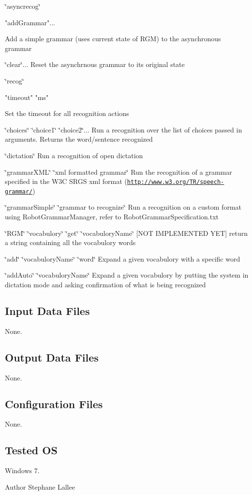 \char`\"{}asyncrecog\char`\"{} \begin{DoxyVerb}"addGrammar"...
\end{DoxyVerb}
 Add a simple grammar (uses current state of R\+G\+M) to the asynchronous grammar

\char`\"{}clear\char`\"{}... Reset the asynchrnous grammar to its original state

\char`\"{}recog\char`\"{} \begin{DoxyVerb}"timeout" "ms"
\end{DoxyVerb}
 Set the timeout for all recognition actions

\char`\"{}choices\char`\"{} \char`\"{}choice1\char`\"{} \char`\"{}choice2\char`\"{}... Run a recognition over the list of choices passed in arguments. Returns the word/sentence recognized

\char`\"{}dictation\char`\"{} Run a recognition of open dictation

\char`\"{}grammar\+X\+M\+L\char`\"{} \char`\"{}xml formatted grammar\char`\"{} Run the recognition of a grammar specified in the W3\+C S\+R\+G\+S xml format (\href{http://www.w3.org/TR/speech-grammar/}{\tt http\+://www.\+w3.\+org/\+T\+R/speech-\/grammar/})

\char`\"{}grammar\+Simple\char`\"{} \char`\"{}grammar to recognize\char`\"{} Run a recognition on a custom format using Robot\+Grammar\+Manager, refer to Robot\+Grammar\+Specification.\+txt

\char`\"{}\+R\+G\+M\char`\"{} \char`\"{}vocabulory\char`\"{} \char`\"{}get\char`\"{} \char`\"{}vocabulory\+Name\char`\"{} \mbox{[}N\+O\+T I\+M\+P\+L\+E\+M\+E\+N\+T\+E\+D Y\+E\+T\mbox{]} return a string containing all the vocabulory words

\char`\"{}add\char`\"{} \char`\"{}vocabulory\+Name\char`\"{} \char`\"{}word\char`\"{} Expand a given vocabulory with a specific word

\char`\"{}add\+Auto\char`\"{} \char`\"{}vocabulory\+Name\char`\"{} Expand a given vocabulory by putting the system in dictation mode and asking confirmation of what is being recognized\hypertarget{group__windows-tts_in_files_sec}{}\subsection{Input Data Files}\label{group__windows-tts_in_files_sec}
None.\hypertarget{group__windows-tts_out_data_sec}{}\subsection{Output Data Files}\label{group__windows-tts_out_data_sec}
None.\hypertarget{group__windows-tts_conf_file_sec}{}\subsection{Configuration Files}\label{group__windows-tts_conf_file_sec}
None.\hypertarget{group__windows-tts_tested_os_sec}{}\subsection{Tested O\+S}\label{group__windows-tts_tested_os_sec}
Windows 7.

\begin{DoxyAuthor}{Author}
Stephane Lallee 
\end{DoxyAuthor}
